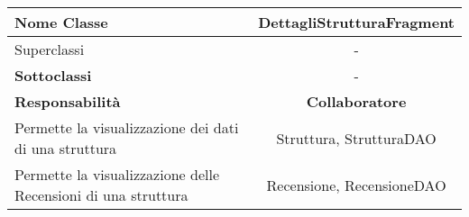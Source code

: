 
\setcounter{table}{0}
\begin{table}[H]
    \centering
    \begin{tabularx}{\textwidth}{||   X  ||  c   ||}
        \hline
        \rowcolor{Gray}
        \textbf{Nome Classe} & DettagliStrutturaFragment\\
        \hline
        Superclassi  &  - \\
        \hline
        \textbf{Sottoclassi} & - \\
        \hline
        \hline
         \textbf{Responsabilità} & \textbf{Collaboratore} \\
         \hline
          Permette la visualizzazione dei dati di una struttura & Struttura, StrutturaDAO \\
         \hline
          Permette la visualizzazione delle Recensioni di una struttura & Recensione, RecensioneDAO \\
         \hline
    \end{tabularx}
\end{table}
